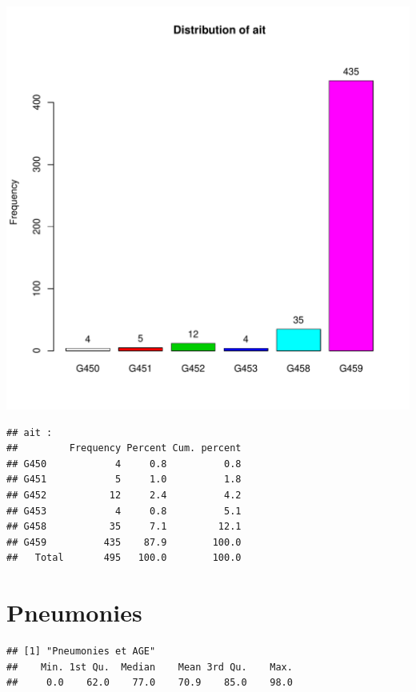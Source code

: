 \documentclass[12pt,english,french,twoside]{report}\usepackage[]{graphicx}\usepackage[]{color}
\makeatletter
\def\maxwidth{ %
  \ifdim\Gin@nat@width>\linewidth
    \linewidth
  \else
    \Gin@nat@width
  \fi
}
\newenvironment{kframe}{%
 \def\at@end@of@kframe{}%
 \ifinner\ifhmode%
  \def\at@end@of@kframe{\end{minipage}}%
  \begin{minipage}{\columnwidth}%
 \fi\fi%
 \def\FrameCommand##1{\hskip\@totalleftmargin \hskip-\fboxsep
 \colorbox{shadecolor}{##1}\hskip-\fboxsep
     \hskip-\linewidth \hskip-\@totalleftmargin \hskip\columnwidth}%
 \MakeFramed {\advance\hsize-\width
   \@totalleftmargin\z@ \linewidth\hsize
   \@setminipage}}%
 {\par\unskip\endMakeFramed%
 \at@end@of@kframe}
\newenvironment{knitrout}{}{} %
\makeatother
\begin{document}
\begin{knitrout}
\color{fgcolor}
\includegraphics[width=\maxwidth]{figure/ait} 
\begin{kframe}\begin{verbatim}
## ait :  
##         Frequency Percent Cum. percent
## G450            4     0.8          0.8
## G451            5     1.0          1.8
## G452           12     2.4          4.2
## G453            4     0.8          5.1
## G458           35     7.1         12.1
## G459          435    87.9        100.0
##   Total       495   100.0        100.0
\end{verbatim}
\end{kframe}
\end{knitrout}


\section{Pneumonies}

\begin{knitrout}
\color{fgcolor}\begin{kframe}
\begin{verbatim}
## [1] "Pneumonies et AGE"
##    Min. 1st Qu.  Median    Mean 3rd Qu.    Max. 
##     0.0    62.0    77.0    70.9    85.0    98.0
\end{verbatim}
\end{kframe}
\end{knitrout}
\end{document}
